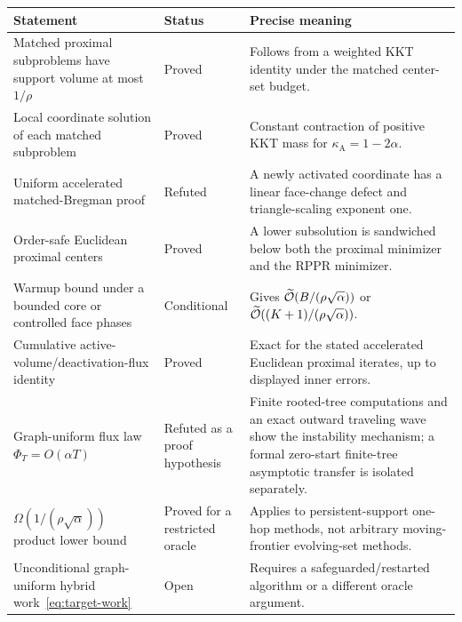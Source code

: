 \begin{center}
\small
\begin{tabularx}{\textwidth}{>{\raggedright\arraybackslash}p{}
                              >{\raggedright\arraybackslash}p{}X}
\toprule
Statement & Status & Precise meaning \\
\midrule
Matched proximal subproblems have support volume at most $1/\rho$
& Proved & Follows from a weighted KKT identity under the matched center-set
budget. \\
Local coordinate solution of each matched subproblem
& Proved & Constant contraction of positive KKT mass for
$\kappa_{\mathrm A}=1-2\alpha$. \\
Uniform accelerated matched-Bregman proof
& Refuted & A newly activated coordinate has a linear face-change defect and
triangle-scaling exponent one. \\
Order-safe Euclidean proximal centers
& Proved & A lower subsolution is sandwiched below both the proximal minimizer
and the RPPR minimizer. \\
Warmup bound under a bounded core or controlled face phases
& Conditional & Gives $\widetilde{\mathcal{O}}(B/(\rho\sqrt\alpha))$ or
$\widetilde{\mathcal{O}}((K+1)/(\rho\sqrt\alpha))$. \\
Cumulative active-volume/deactivation-flux identity
& Proved & Exact for the stated accelerated Euclidean proximal iterates, up
to displayed inner errors. \\
Graph-uniform flux law $\Phi_T=O(\alpha T)$
& Refuted as a proof hypothesis & Finite rooted-tree computations and an
exact outward traveling wave show the instability mechanism; a formal
zero-start finite-tree asymptotic transfer is isolated separately. \\
$\Omega(1/(\rho\sqrt\alpha))$ product lower bound
& Proved for a restricted oracle & Applies to persistent-support one-hop
methods, not arbitrary moving-frontier evolving-set methods. \\
Unconditional graph-uniform hybrid work~\eqref{eq:target-work}
& Open & Requires a safeguarded/restarted algorithm or a different oracle
argument. \\
\bottomrule
\end{tabularx}
\end{center}
